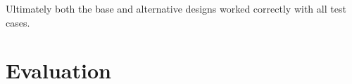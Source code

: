 \documentclass[10pt]{article}
\begin{document}



Ultimately both the base and alternative designs worked correctly with all test cases.  \\


\section{Evaluation}




\end{document}
